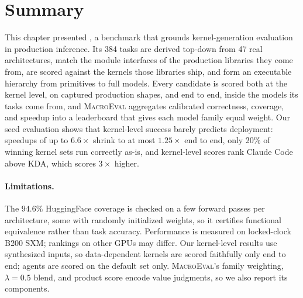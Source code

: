 \section{Summary}
\label{fastkernels:sec:summary}

This chapter presented \FastKernels, a benchmark that grounds kernel-generation evaluation in production inference.
Its 384 tasks are derived top-down from 47 real architectures, match the module interfaces of the production libraries they come from, are scored against the kernels those libraries ship, and form an executable hierarchy from primitives to full models.
Every candidate is scored both at the kernel level, on captured production shapes, and end to end, inside the models its tasks come from, and \textsc{MacroEval} aggregates calibrated correctness, coverage, and speedup into a leaderboard that gives each model family equal weight.
Our seed evaluation shows that kernel-level success barely predicts deployment: speedups of up to $6.6\times$ shrink to at most $1.25\times$ end to end, only 20\% of winning kernel sets run correctly as-is, and kernel-level scores rank Claude Code above KDA, which scores $3\times$ higher.

\paragraph{Limitations.}
The $94.6\%$ HuggingFace coverage is checked on a few forward passes per architecture, some with randomly initialized weights, so it certifies functional equivalence rather than task accuracy.
Performance is measured on locked-clock B200 SXM; rankings on other GPUs may differ.
Our kernel-level results use synthesized inputs, so data-dependent kernels are scored faithfully only end to end; agents are scored on the default set only.
\textsc{MacroEval}'s family weighting, $\lambda{=}0.5$ blend, and product score encode value judgments, so we also report its components.
